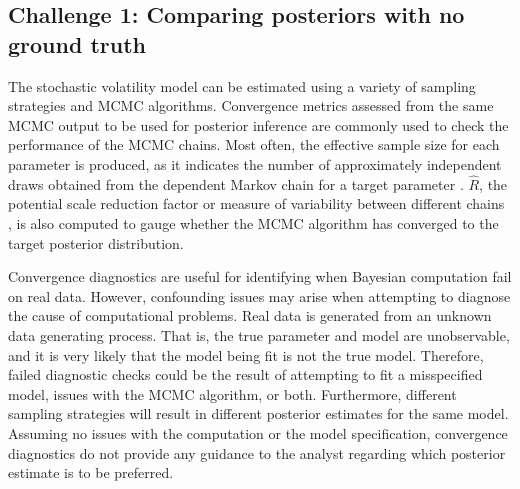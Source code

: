 \documentclass[12pt, a4paper]{article}
\begin{document}
\subsection{Challenge 1: Comparing posteriors with no ground truth}
    The stochastic volatility model can be estimated using a variety of sampling strategies and MCMC algorithms. Convergence metrics assessed from the same MCMC output to be used for posterior inference are commonly used to check the performance of the MCMC chains. Most often, the effective sample size for each parameter is produced, as it indicates the number of approximately independent draws obtained from the dependent Markov chain for a target parameter \citep{gelman2013bayesian}. $\hat{R}$, the potential scale reduction factor or measure of variability between different chains \citep{gelman1992inference}, is also computed to gauge whether the MCMC algorithm has converged to the target posterior distribution.

    Convergence diagnostics are useful for identifying when Bayesian computation fail on real data. However, confounding issues may arise when attempting to diagnose the cause of computational problems. Real data is generated from an unknown data generating process. That is, the true parameter and model are unobservable, and it is very likely that the model being fit is not the true model. Therefore, failed diagnostic checks could be the result of attempting to fit a misspecified model, issues with the MCMC algorithm, or both. Furthermore, different sampling strategies will result in different posterior estimates for the same model. Assuming no issues with the computation or the model specification, convergence diagnostics do not provide any guidance to the analyst regarding which posterior estimate is to be preferred.
\end{document}
